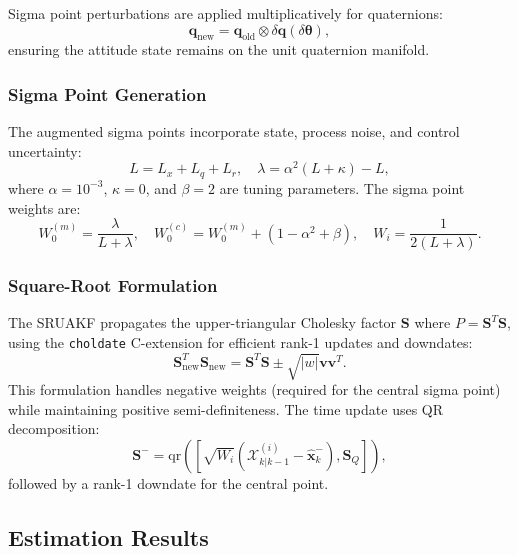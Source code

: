 \documentclass[conference]{IEEEtran}
\begin{document}
Sigma point perturbations are applied multiplicatively for quaternions:
\begin{equation}
\mathbf{q}_{\text{new}} = \mathbf{q}_{\text{old}} \otimes \delta\mathbf{q}(\delta\boldsymbol{\theta}),
\end{equation}
ensuring the attitude state remains on the unit quaternion manifold.

\subsubsection{Sigma Point Generation}
The augmented sigma points incorporate state, process noise, and control uncertainty:
\begin{equation}
L = L_x + L_q + L_r, \quad \lambda = \alpha^2(L + \kappa) - L,
\end{equation}
where $\alpha = 10^{-3}$, $\kappa = 0$, and $\beta = 2$ are tuning parameters. The sigma point weights are:
\begin{equation}
W_0^{(m)} = \frac{\lambda}{L + \lambda}, \quad
W_0^{(c)} = W_0^{(m)} + (1 - \alpha^2 + \beta), \quad
W_i = \frac{1}{2(L + \lambda)}.
\end{equation}

\subsubsection{Square-Root Formulation}
The SRUAKF propagates the upper-triangular Cholesky factor $\mathbf{S}$ where $P = \mathbf{S}^T\mathbf{S}$, using the \texttt{choldate} C-extension for efficient rank-1 updates and downdates:
\begin{equation}
\mathbf{S}_{\text{new}}^T \mathbf{S}_{\text{new}} = \mathbf{S}^T \mathbf{S} \pm \sqrt{|w|} \mathbf{v} \mathbf{v}^T.
\end{equation}
This formulation handles negative weights (required for the central sigma point) while maintaining positive semi-definiteness. The time update uses QR decomposition:
\begin{equation}
\mathbf{S}^- = \text{qr}\left([\sqrt{W_i}(\mathcal{X}_{k|k-1}^{(i)} - \hat{\mathbf{x}}_k^-), \mathbf{S}_Q]\right),
\end{equation}
followed by a rank-1 downdate for the central point.

\subsection{Estimation Results}\label{subsec:est_results}
\end{document}
